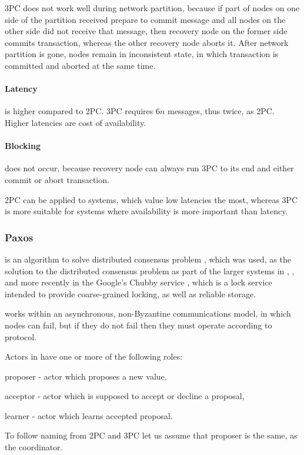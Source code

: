 3PC does not work well during network partition, because if part of nodes on one side of the partition received prepare to commit message and all nodes on the other side did not receive that message, then recovery node on the former side commits transaction, whereas the other recovery node aborts it. After network partition is gone, nodes remain in inconsistent state, in which transaction is committed and aborted at the same time.

\paragraph{Latency} is higher compared to 2PC. 3PC requires $6n$ messages, thus twice, as 2PC. Higher latencies are cost of availability.

\paragraph{Blocking} does not occur, because recovery node can always run 3PC to its end and either commit or abort transaction.

2PC can be applied to systems, which value low latencies the most, whereas 3PC is more suitable for systems where availability is more important than latency.



\subsubsection{Paxos}
\paxos is an algorithm to solve distributed consensus problem \cite{Lamport1998partTimeParliment} \cite{lamport2001paxosMadeSimple}, which was used, as the solution to the distributed consensus problem as part of the larger systems in \cite{chandra2007PaxosMadeLive}, \cite{lampson1996build}, and more recently in the Google's Chubby service \cite{burrows2006chubby}, which is a lock service intended to provide coarse-grained locking, as well as reliable storage. 

\paxos works within an asynchronous, non-Byzantine communications model, in which nodes can fail, but if they do not fail then they must operate according to \paxos protocol.

Actors in \paxos have one or more of the following roles: \begin{enumerate*}[label=\alph*)]
\item proposer - actor which proposes a new value,
\item acceptor - actor which is supposed to accept or decline a proposal,
\item learner - actor which learns accepted proposal.
\end{enumerate*} To follow naming from 2PC and 3PC let us assume that proposer is the same, as the coordinator.

